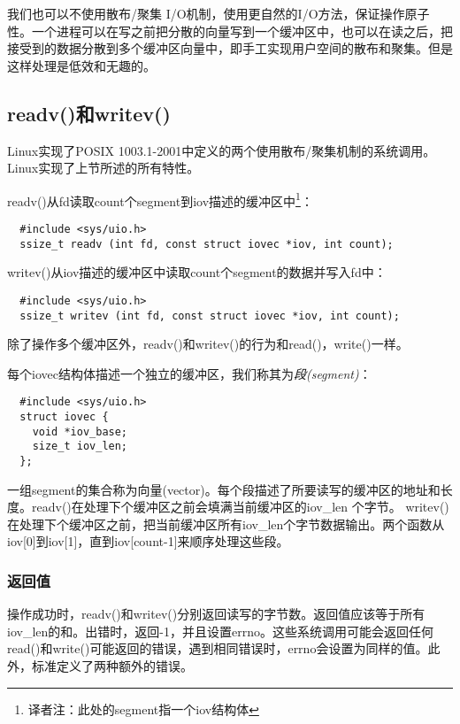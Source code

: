 我们也可以不使用散布/聚集 I/O机制，使用更自然的I/O方法，保证操作原子性。一个进程可以在写之前把分散的向量写到一个缓冲区中，也可以在读之后，把接受到的数据分散到多个缓冲区向量中，即手工实现用户空间的散布和聚集。但是这样处理是低效和无趣的。

\subsection{readv()和writev()}

Linux实现了POSIX 1003.1-2001中定义的两个使用散布/聚集机制的系统调用。Linux实现了上节所述的所有特性。

readv()从fd读取count个segment到iov描述的缓冲区中\footnote[1]{译者注：此处的segment指一个iov结构体}：

\begin{lstlisting}
  #include <sys/uio.h>
  ssize_t readv (int fd, const struct iovec *iov, int count);
\end{lstlisting}

writev()从iov描述的缓冲区中读取count个segment的数据并写入fd中：

\begin{lstlisting}
  #include <sys/uio.h>
  ssize_t writev (int fd, const struct iovec *iov, int count);
\end{lstlisting}

除了操作多个缓冲区外，readv()和writev()的行为和read()，write()一样。

每个iovec结构体描述一个独立的缓冲区，我们称其为\emph{段(segment)}：

\begin{lstlisting}
  #include <sys/uio.h>
  struct iovec {
    void *iov_base;
    size_t iov_len;
  };
\end{lstlisting}

一组segment的集合称为向量(vector)。每个段描述了所要读写的缓冲区的地址和长度。readv()在处理下个缓冲区之前会填满当前缓冲区的iov\_len 个字节。 writev()在处理下个缓冲区之前，把当前缓冲区所有iov\_len个字节数据输出。两个函数从iov[0]到iov[1]，直到iov[count-1]来顺序处理这些段。

\subsubsection{返回值}

操作成功时，readv()和writev()分别返回读写的字节数。返回值应该等于所有iov\_len的和。出错时，返回-1，并且设置errno。这些系统调用可能会返回任何read()和write()可能返回的错误，遇到相同错误时，errno会设置为同样的值。此外，标准定义了两种额外的错误。

